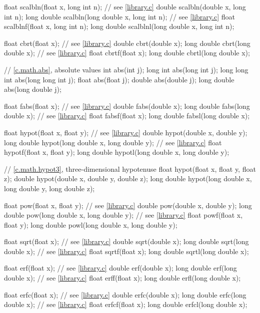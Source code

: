\begin{codeblock}
{  float scalbln(float x, long int n);   // see \ref{library.c}
  double scalbln(double x, long int n);
  long double scalbln(long double x, long int n);   // see \ref{library.c}
  float scalblnf(float x, long int n);
  long double scalblnl(long double x, long int n);

  float cbrt(float x);                  // see \ref{library.c}
  double cbrt(double x);
  long double cbrt(long double x);      // see \ref{library.c}
  float cbrtf(float x);
  long double cbrtl(long double x);

  // \ref{c.math.abs}, absolute values
  int abs(int j);
  long int abs(long int j);
  long long int abs(long long int j);
  float abs(float j);
  double abs(double j);
  long double abs(long double j);

  float fabs(float x);                  // see \ref{library.c}
  double fabs(double x);
  long double fabs(long double x);      // see \ref{library.c}
  float fabsf(float x);
  long double fabsl(long double x);

  float hypot(float x, float y);        // see \ref{library.c}
  double hypot(double x, double y);
  long double hypot(long double x, long double y);  // see \ref{library.c}
  float hypotf(float x, float y);
  long double hypotl(long double x, long double y);

  // \ref{c.math.hypot3}, three-dimensional hypotenuse
  float hypot(float x, float y, float z);
  double hypot(double x, double y, double z);
  long double hypot(long double x, long double y, long double z);

  float pow(float x, float y);          // see \ref{library.c}
  double pow(double x, double y);
  long double pow(long double x, long double y);    // see \ref{library.c}
  float powf(float x, float y);
  long double powl(long double x, long double y);

  float sqrt(float x);                  // see \ref{library.c}
  double sqrt(double x);
  long double sqrt(long double x);      // see \ref{library.c}
  float sqrtf(float x);
  long double sqrtl(long double x);

  float erf(float x);                   // see \ref{library.c}
  double erf(double x);
  long double erf(long double x);       // see \ref{library.c}
  float erff(float x);
  long double erfl(long double x);

  float erfc(float x);                  // see \ref{library.c}
  double erfc(double x);
  long double erfc(long double x);      // see \ref{library.c}
  float erfcf(float x);
  long double erfcl(long double x);

}
\end{codeblock}

